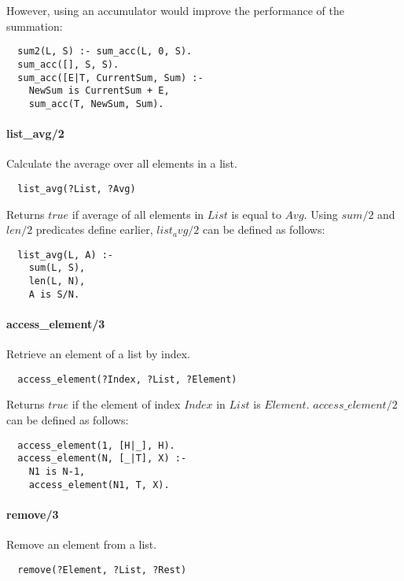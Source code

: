\documentclass{article}
\begin{document}
\begin{multicols}{2}
  However, using an accumulator would improve the performance of the summation:
  
  \begin{lstlisting}
  sum2(L, S) :- sum_acc(L, 0, S).
  sum_acc([], S, S).
  sum_acc([E|T, CurrentSum, Sum) :-
    NewSum is CurrentSum + E,
    sum_acc(T, NewSum, Sum).
  \end{lstlisting} 
  
  \paragraph{list\_avg/2} Calculate the average over all elements in a list.
  
  \begin{lstlisting}
  list_avg(?List, ?Avg)
  \end{lstlisting} 
  
  Returns $true$ if average of all elements in $List$ is equal to $Avg$. Using $sum/2$ and $len/2$ predicates define earlier, $list_avg/2$ can be defined as follows:

  \begin{lstlisting}
  list_avg(L, A) :-
    sum(L, S),
    len(L, N),
    A is S/N.
  \end{lstlisting}
 
  \paragraph{access\_element/3} Retrieve an element of a list by index.
  
  \begin{lstlisting}
  access_element(?Index, ?List, ?Element)
  \end{lstlisting}
  
  Returns $true$ if the element of index $Index$ in $List$ is $Element$. $access\_element/2$ can be defined as follows:

  \begin{lstlisting}
  access_element(1, [H|_], H).
  access_element(N, [_|T], X) :-
    N1 is N-1,
    access_element(N1, T, X).
  \end{lstlisting}
  
  \paragraph{remove/3} Remove an element from a list.
  
  \begin{lstlisting}
  remove(?Element, ?List, ?Rest)
  \end{lstlisting}
  

\end{multicols}
\end{document}
